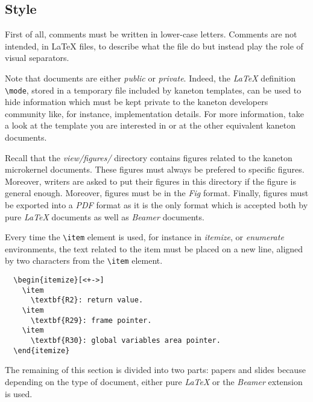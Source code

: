 %
%

\subsection{Style}

First of all, comments must be written in lower-case letters. Comments
are not intended, in {\LaTeX} files, to describe what the file do but instead
play the role of visual separators.

Note that documents are either \textit{public} or \textit{private}. Indeed,
the \textit{\LaTeX} definition \verb|\mode|, stored in a temporary file
included by kaneton templates, can be used to hide information which must be
kept private to the kaneton developers community like, for instance,
implementation details. For more information, take a look at the template
you are interested in or at the other equivalent kaneton documents.

Recall that the \textit{view/figures/} directory contains figures related
to the kaneton microkernel documents. These figures must always be prefered
to specific figures. Moreover, writers are asked to put their figures in
this directory if the figure is general enough. Moreover, figures must be
in the \textit{Fig} format. Finally, figures must be exported into a
\textit{PDF} format as it is the only format which is accepted both by
pure \textit{\LaTeX} documents as well as \textit{Beamer} documents.

Every time the \verb|\item| element is used, for instance in \textit{itemize},
or \textit{enumerate} environments, the text related to the item must be
placed on a new line, aligned by two characters from the \verb|\item| element.

\begin{verbatim}
  \begin{itemize}[<+->]
    \item
      \textbf{R2}: return value.
    \item
      \textbf{R29}: frame pointer.
    \item
      \textbf{R30}: global variables area pointer.
  \end{itemize}
\end{verbatim}

The remaining of this section is divided into two parts: papers and slides
because depending on the type of document, either pure \textit{\LaTeX}
or the \textit{Beamer} extension is used.

